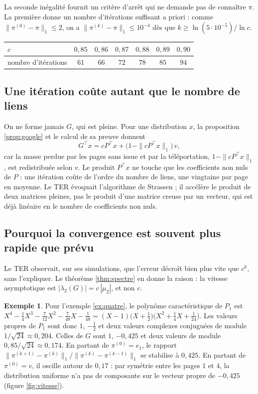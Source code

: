 \documentclass[11pt,a4paper]{article}
\theoremstyle{plain}
\theoremstyle{definition}
\newtheorem{exemple}[theoreme]{Exemple}
\theoremstyle{remark}
\begin{document}
La seconde inégalité fournit un critère d'arrêt qui ne demande pas de connaître $\pi$. La première donne un nombre d'itérations suffisant a priori : comme $\|\pi^{(0)}-\pi\|_1\leq2$, on a $\|\pi^{(k)}-\pi\|_1\leq10^{-4}$ dès que $k\geq\ln(5\cdot10^{-5})/\ln c$.

\begin{center}
\begin{tabular}{@{}lcccccc@{}}
\toprule
$c$ & $0{,}85$ & $0{,}86$ & $0{,}87$ & $0{,}88$ & $0{,}89$ & $0{,}90$ \\
\midrule
nombre d'itérations & $61$ & $66$ & $72$ & $78$ & $85$ & $94$ \\
\bottomrule
\end{tabular}
\end{center}

\subsection{Une itération coûte autant que le nombre de liens}

On ne forme jamais $G$, qui est pleine. Pour une distribution $x$, la proposition \ref{prop:google} et le calcul de sa preuve donnent
\[
  G^\top x=cP^\top x+\big(1-\|cP^\top x\|_1\big)\,v ,
\]
car la masse perdue par les pages sans issue et par la téléportation, $1-\|cP^\top x\|_1$, est redistribuée selon $v$. Le produit $P^\top x$ ne touche que les coefficients non nuls de $P$ : une itération coûte de l'ordre du nombre de liens, une vingtaine par page en moyenne. Le TER évoquait l'algorithme de Strassen ; il accélère le produit de deux matrices pleines, pas le produit d'une matrice creuse par un vecteur, qui est déjà linéaire en le nombre de coefficients non nuls.

\subsection{Pourquoi la convergence est souvent plus rapide que prévu}

Le TER observait, sur ses simulations, que l'erreur décroît bien plus vite que $c^k$, sans l'expliquer. Le théorème \ref{thm:spectre} en donne la raison : la vitesse asymptotique est $|\lambda_2(G)|=c\,|\mu_2|$, et non $c$.

\begin{exemple}\label{ex:vitesse}
Pour l'exemple \ref{ex:quatre}, le polynôme caractéristique de $P_1$ est $X^4-\frac14X^3-\frac7{12}X^2-\frac7{48}X-\frac1{48}=(X-1)\big(X+\frac12\big)\big(X^2+\frac14X+\frac1{24}\big)$. Les valeurs propres de $P_1$ sont donc $1$, $-\frac12$ et deux valeurs complexes conjuguées de module $1/\sqrt{24}\approx0{,}204$. Celles de $G$ sont $1$, $-0{,}425$ et deux valeurs de module $0{,}85/\sqrt{24}\approx0{,}174$. En partant de $\pi^{(0)}=e_1$, le rapport $\|\pi^{(k+1)}-\pi^{(k)}\|_1/\|\pi^{(k)}-\pi^{(k-1)}\|_1$ se stabilise à $0{,}425$. En partant de $\pi^{(0)}=v$, il oscille autour de $0{,}17$ : par symétrie entre les pages $1$ et $4$, la distribution uniforme n'a pas de composante sur le vecteur propre de $-0{,}425$ (figure \ref{fig:vitesse}).
\end{exemple}
\end{document}
